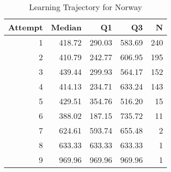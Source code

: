 \begin{table}[htbp]
\centering
\caption{Learning Trajectory for Norway}
\label{tab:learning-trajectory}
\begin{tabular}{rrrrr}
\toprule
Attempt & Median & Q1 & Q3 & N \\
\midrule
1 & 418.72 & 290.03 & 583.69 & 240 \\
2 & 410.79 & 242.77 & 606.95 & 195 \\
3 & 439.44 & 299.93 & 564.17 & 152 \\
4 & 414.13 & 234.71 & 633.24 & 143 \\
5 & 429.51 & 354.76 & 516.20 & 15 \\
6 & 388.02 & 187.15 & 735.72 & 11 \\
7 & 624.61 & 593.74 & 655.48 & 2 \\
8 & 633.33 & 633.33 & 633.33 & 1 \\
9 & 969.96 & 969.96 & 969.96 & 1 \\
\bottomrule
\end{tabular}
\end{table}
